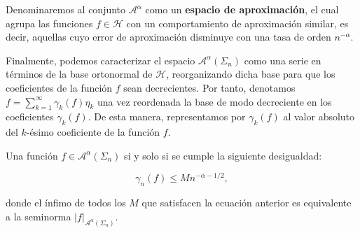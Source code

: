 Denominaremos al conjunto $\mathcal{A}^{\alpha}$ como un \textbf{espacio de aproximación}, el cual agrupa las funciones $f \in \mathcal{H}$ con un comportamiento de aproximación similar, es decir, aquellas cuyo error de aproximación disminuye con una tasa de orden $n^{-\alpha}$.

Finalmente, podemos caracterizar el espacio $\mathcal{A}^{\alpha}(\Sigma_n)$ como una serie en términos de la base ortonormal de $\mathcal{H}$, reorganizando dicha base para que los coeficientes de la función $f$ sean decrecientes. Por tanto, denotamos $f = \sum_{k=1}^{\infty} \gamma_k(f) \eta_k$ una vez reordenada la base de modo decreciente en los coeficientes $\gamma_k(f)$. De esta manera, representamos por $\gamma_k(f)$ al valor absoluto del $k$-ésimo coeficiente de la función $f$. 

\begin{teorema}
    Una función $f \in \mathcal{A}^{\alpha}(\Sigma_n)$ si y solo si se cumple la siguiente desigualdad:

    \begin{equation}\label{eq:coeficientes-reordenados1}
        \gamma_n(f) \leq M n^{-\alpha - 1/2},
    \end{equation}

    donde el ínfimo de todos los $M$ que satisfacen la ecuación anterior es equivalente a la seminorma $|f|_{\mathcal{A}^{\alpha}(\Sigma_n)}$.
\end{teorema}

